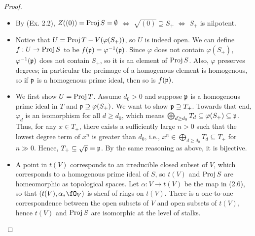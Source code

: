\documentclass[a4paper]{article}
\begin{document}
\begin{enumerate} [label=\textbf{\arabic*.}, leftmargin=0em]
\begin{proof} $ $ \vspace{0pt}
    \begin{itemize} [leftmargin=0cm]
        \item[(a)] By (Ex. 2.2), $Z((0)) = \operatorname{Proj}{S} = \emptyset$ $\Leftrightarrow$ $\sqrt{(0)} \supseteq S_+$ $\Leftrightarrow$ $S_+$ is nilpotent.

        \item[(b)] Notice that $U = \operatorname{Proj}{T} - V(\varphi(S_+))$, so $U$ is indeed open. We can define $f : U \to \operatorname{Proj}{S}$ to be $f(\mathfrak{p}) = \varphi^{-1}(\mathfrak{p})$. Since $\varphi$ does not contain $\varphi(S_+)$, $\varphi^{-1}(\mathfrak{p})$ does not contain $S_+$, so it is an element of $\operatorname{Proj}{S}$. Also, $\varphi$ preserves degrees; in particular the preimage of a homogenous element is homogenous, so if $\mathfrak{p}$ is a homogenous prime ideal, then so is $f(\mathfrak{p})$.

        \item[(c)] We first show $U = \operatorname{Proj}{T}$. Assume $d_0 > 0$ and suppose $\mathfrak{p}$ is a homogenous prime ideal in $T$ and $\mathfrak{p} \supseteq \varphi(S_+)$. We want to show $\mathfrak{p} \supseteq T_+$. Towards that end, $\varphi_d$ is an isomorphism for all $d \geq d_0$, which means $\bigoplus_{d \geq d_0} T_d \subseteq \varphi(S_+) \subseteq \goth{p}$. Thus, for any $x \in T_+$, there exists a sufficiently large $n > 0$ such that the lowest degree term of $x^n$ is greater than $d_0$, i.e., $x^n \in \bigoplus_{d \geq d_0} T_d \subseteq T_+$ for $n \gg 0$. Hence, $T_+ \subseteq \sqrt{\mathfrak{p}} = \mathfrak{p}$. By the same reasoning as above, it is bijective.

        \item[(d)] A point in $t(V)$ corresponds to an irreducible closed subset of $V$, which corresponds to a homogenous prime ideal of $S$, so $t(V)$ and $\operatorname{Proj}{S}$ are homeomorphic as topological spaces. Let $\alpha : V \to t(V)$ be the map in (2.6), so that $(t(V), \alpha_* \fO_V)$ is sheaf of rings on $t(V)$. There is a one-to-one correspondence between the open subsets of $V$ and open subsets of $t(V)$, hence $t(V)$ and $\operatorname{Proj}{S}$ are isomorphic at the level of stalks.
    \end{itemize}
\end{proof}


\end{enumerate}
\end{document}
